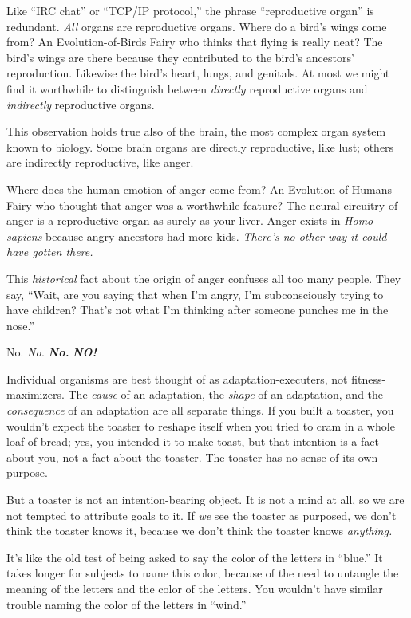 
{
 Like ``IRC chat'' or
``TCP/IP protocol,'' the phrase
``reproductive organ'' is redundant.
\textit{All} organs are reproductive organs. Where do a
bird's wings come from? An Evolution-of-Birds Fairy who
thinks that flying is really neat? The bird's wings are
there because they contributed to the bird's
ancestors' reproduction. Likewise the
bird's heart, lungs, and genitals. At most we might
find it worthwhile to distinguish between \textit{directly}
reproductive organs and \textit{indirectly} reproductive organs. }

{
 This observation holds true also of the brain, the most complex
organ system known to biology. Some brain organs are directly
reproductive, like lust; others are indirectly reproductive, like
anger.}

{
 Where does the human emotion of anger come from? An
Evolution-of-Humans Fairy who thought that anger was a worthwhile
feature? The neural circuitry of anger is a reproductive organ as
surely as your liver. Anger exists in \textit{Homo sapiens} because
angry ancestors had more kids. \textit{There's no other
way it could have gotten there.}}

{
 This \textit{historical} fact about the origin of anger confuses
all too many people. They say, ``Wait, are you saying
that when I'm angry, I'm subconsciously
trying to have children? That's not what
I'm thinking after someone punches me in the
nose.''}

{
 No. \textit{No.} \textbf{\textit{No.}} \textbf{\textit{NO!}}}

{
 Individual organisms are best thought of as adaptation-executers,
not fitness-maximizers. The \textit{cause} of an adaptation, the
\textit{shape} of an adaptation, and the \textit{consequence} of an
adaptation are all separate things. If you built a toaster, you
wouldn't expect the toaster to reshape itself when you
tried to cram in a whole loaf of bread; yes, you intended it to make
toast, but that intention is a fact about you, not a fact about the
toaster. The toaster has no sense of its own purpose.}

{
 But a toaster is not an intention-bearing object. It is not a mind
at all, so we are not tempted to attribute goals to it. If \textit{we}
see the toaster as purposed, we don't think the toaster
knows it, because we don't think the toaster knows
\textit{anything.}}

{
 It's like the old test of being asked to say the
color of the letters in ``blue.'' It
takes longer for subjects to name this color, because of the need to
untangle the meaning of the letters and the color of the letters. You
wouldn't have similar trouble naming the color of the
letters in ``wind.''}

